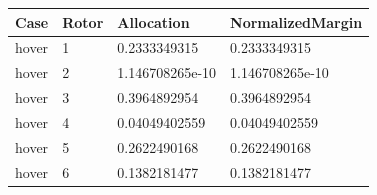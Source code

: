 \begin{tabular}{@{}llll@{}}
\toprule
Case & Rotor & Allocation & NormalizedMargin \\
\midrule
hover & 1 & 0.2333349315 & 0.2333349315 \\
hover & 2 & 1.146708265e-10 & 1.146708265e-10 \\
hover & 3 & 0.3964892954 & 0.3964892954 \\
hover & 4 & 0.04049402559 & 0.04049402559 \\
hover & 5 & 0.2622490168 & 0.2622490168 \\
hover & 6 & 0.1382181477 & 0.1382181477 \\
\bottomrule
\end{tabular}
